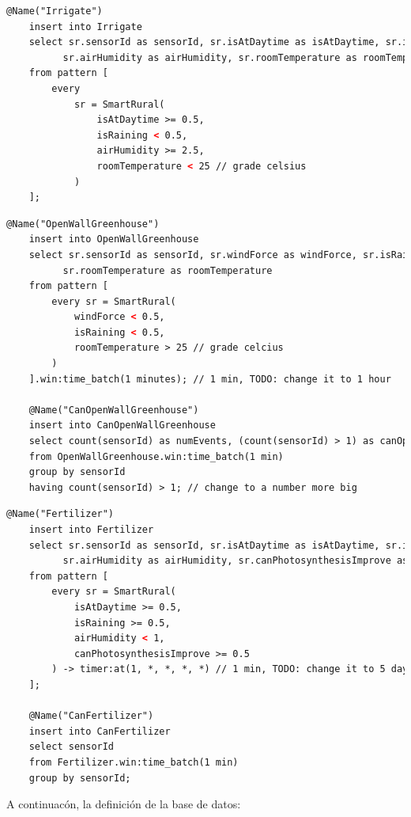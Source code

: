 \documentclass[a4paper,12pt]{article}
\begin{document}
\begin{lstlisting}[language=xml,caption=Irrigate.epl]
    @Name("Irrigate") 
    insert into Irrigate 
    select sr.sensorId as sensorId, sr.isAtDaytime as isAtDaytime, sr.isRaining as isRaining,
          sr.airHumidity as airHumidity, sr.roomTemperature as roomTemperature
    from pattern [
        every
            sr = SmartRural(
                isAtDaytime >= 0.5,
                isRaining < 0.5,
                airHumidity >= 2.5,
                roomTemperature < 25 // grade celsius
            )
    ];
\end{lstlisting}

\begin{lstlisting}[language=xml,caption=CanOpenWallGreenhouse.epl]
    @Name("OpenWallGreenhouse")
    insert into OpenWallGreenhouse 
    select sr.sensorId as sensorId, sr.windForce as windForce, sr.isRaining as isRaining,
          sr.roomTemperature as roomTemperature
    from pattern [
        every sr = SmartRural(
            windForce < 0.5,
            isRaining < 0.5,
            roomTemperature > 25 // grade celcius
        )
    ].win:time_batch(1 minutes); // 1 min, TODO: change it to 1 hour

    @Name("CanOpenWallGreenhouse")
    insert into CanOpenWallGreenhouse
    select count(sensorId) as numEvents, (count(sensorId) > 1) as canOpen
    from OpenWallGreenhouse.win:time_batch(1 min)
    group by sensorId
    having count(sensorId) > 1; // change to a number more big
\end{lstlisting}

\begin{lstlisting}[language=xml,caption=CanFertilizer.epl]
    @Name("Fertilizer") 
    insert into Fertilizer 
    select sr.sensorId as sensorId, sr.isAtDaytime as isAtDaytime, sr.isRaining as isRaining,
          sr.airHumidity as airHumidity, sr.canPhotosynthesisImprove as canPhotosynthesisImprove
    from pattern [
        every sr = SmartRural(
            isAtDaytime >= 0.5,
            isRaining >= 0.5,
            airHumidity < 1,
            canPhotosynthesisImprove >= 0.5
        ) -> timer:at(1, *, *, *, *) // 1 min, TODO: change it to 5 days
    ];

    @Name("CanFertilizer")
    insert into CanFertilizer
    select sensorId
    from Fertilizer.win:time_batch(1 min)
    group by sensorId;
\end{lstlisting}

A continuacón, la definición de la base de datos:
\end{document}
